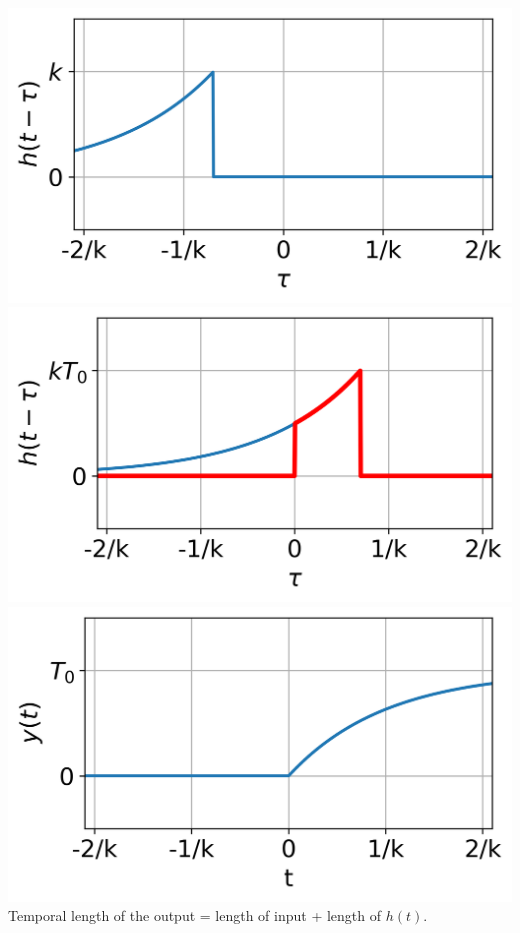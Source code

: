 \documentclass[10pt,landscape,a4paper]{article}
\begin{document}
\begin{multicols}{3}
	\includegraphics[width=\textwidth/5]{thermo_impulse_response_reversed_case1}
	\includegraphics[width=\textwidth/5]{thermo_impulse_response_reversed_case2b}
	\includegraphics[width=\textwidth/5]{thermo_step_response}\\
	Temporal length of the output = length of input + length of $h(t)$.
	
	\newpage

\end{multicols}
\end{document}
